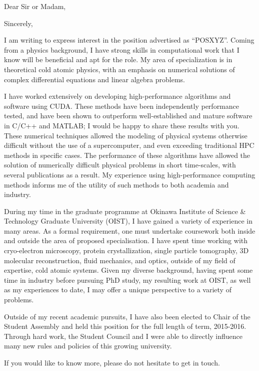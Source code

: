 \documentclass[12pt,a4paper,unicode]{moderncv}
\begin{document}
    \date{\today} %
    \opening{Dear Sir or Madam,}
    \closing{Sincerely,}
    \makelettertitle
{
    I am writing to express interest in the position advertised as ``POSXYZ''. Coming from a physics background, I have strong skills in computational work that I know will be beneficial and apt for the role. My area of specialization is in theoretical cold atomic physics, with an emphasis on numerical solutions of complex differential equations and linear algebra problems.

    I have worked extensively on developing high-performance algorithms and software using CUDA. These methods have been independently performance tested, and have been shown to outperform well-established and mature software in C/C++ and \textsc{MATLAB}; I would be happy to share these results with you. These numerical techniques allowed the modeling of physical systems otherwise difficult without the use of a supercomputer, and even exceeding traditional HPC methods in specific cases. The performance of these algorithms have allowed the solution of numerically difficult physical problems in short time-scales, with several publications as a result. My experience using high-performance computing methods informs me of the utility of such methods to both academia and industry.

    During my time in the graduate programme at Okinawa Institute of Science \& Technology Graduate University (OIST), I have gained a variety of experience in many areas. As a formal requirement, one must undertake coursework both inside and outside the area of proposed specialisation. I have spent time working with cryo-electron microscopy, protein crystallization, single particle tomography, 3D molecular reconstruction, fluid mechanics, and optics, outside of my field of expertise, cold atomic systems. Given my diverse background, having spent some time in industry before pursuing PhD study, my resulting work at OIST, as well as my experiences to date, I may offer a unique perspective to a variety of problems.

    Outside of my recent academic pursuits, I have also been elected to Chair of the Student Assembly and held this position for the full length of term, 2015-2016. Through hard work, the Student Council and I were able to directly influence many new rules and policies of this growing university.

If you would like to know more, please do not hesitate to get in touch.
}

\makeletterclosing
\end{document}
